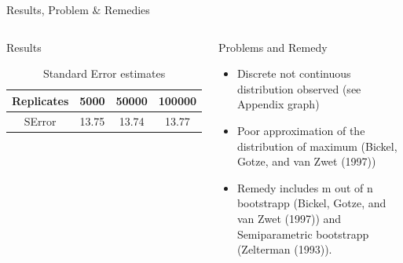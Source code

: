 \documentclass[a4paper,9pt]{beamer}\usepackage[]{graphicx}\usepackage[]{color}
\begin{document}
\begin{frame}{Results, Problem \& Remedies}


\begin{columns}
\begin{block}{Results}
\begin{table}[h]
\begin{tabular}{cccc}
\hline
Replicates & 5000 & 50000 & 100000\\ 
\hline
SError & 13.75 & 13.74 & 13.77\\
\hline
\end{tabular}
\caption{Standard Error estimates}
\end{table}
\end{block}
\begin{block}{Problems and Remedy}
\begin{itemize}
\item Discrete not continuous distribution observed (\alert{see Appendix graph})
\item Poor approximation of the distribution of maximum (\alert{Bickel, Gotze, and van Zwet (1997)})
\item Remedy includes m out of n bootstrapp (\alert{Bickel, Gotze, and van Zwet (1997)}) and Semiparametric bootstrapp (\alert{Zelterman (1993)}).
\end{itemize}
\end{block}
\end{columns}
\end{frame}
\end{document}
